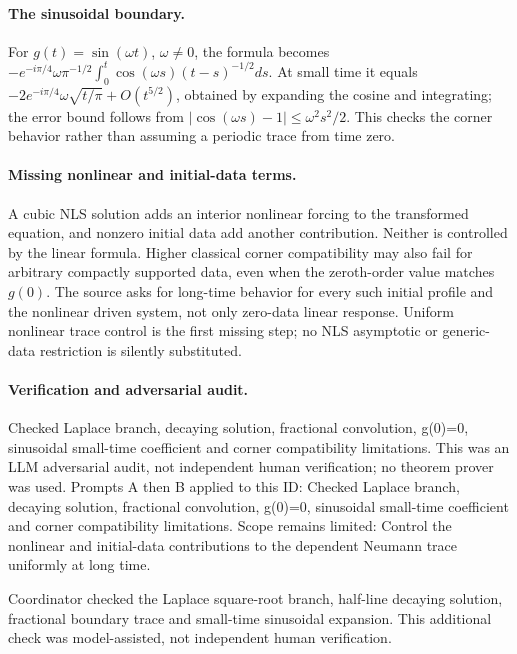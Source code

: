 \documentclass[11pt]{article}
\begin{document}
\paragraph{The sinusoidal boundary.}For \(g(t)=\sin(\omega t)\), \(\omega\ne0\), the formula becomes \(-e^{-i\pi/4}\omega\pi^{-1/2}\int_0^t\cos(\omega s)(t-s)^{-1/2}ds\). At small time it equals \(-2e^{-i\pi/4}\omega\sqrt{t/\pi}+O(t^{5/2})\), obtained by expanding the cosine and integrating; the error bound follows from \(|\cos(\omega s)-1|\le\omega^2s^2/2\). This checks the corner behavior rather than assuming a periodic trace from time zero.
\paragraph{Missing nonlinear and initial-data terms.}A cubic NLS solution adds an interior nonlinear forcing to the transformed equation, and nonzero initial data add another contribution. Neither is controlled by the linear formula. Higher classical corner compatibility may also fail for arbitrary compactly supported data, even when the zeroth-order value matches \(g(0)\). The source asks for long-time behavior for every such initial profile and the nonlinear driven system, not only zero-data linear response. Uniform nonlinear trace control is the first missing step; no NLS asymptotic or generic-data restriction is silently substituted.

\paragraph{Verification and adversarial audit.}
Checked Laplace branch, decaying solution, fractional convolution, g(0)=0, sinusoidal small-time coefficient and corner compatibility limitations. This was an LLM adversarial audit, not independent human verification; no theorem prover was used. Prompts A then B applied to this ID: Checked Laplace branch, decaying solution, fractional convolution, g(0)=0, sinusoidal small-time coefficient and corner compatibility limitations. Scope remains limited: Control the nonlinear and initial-data contributions to the dependent Neumann trace uniformly at long time.

Coordinator checked the Laplace square-root branch, half-line decaying solution, fractional boundary trace and small-time sinusoidal expansion. This additional check was model-assisted, not independent human verification.
\end{document}
